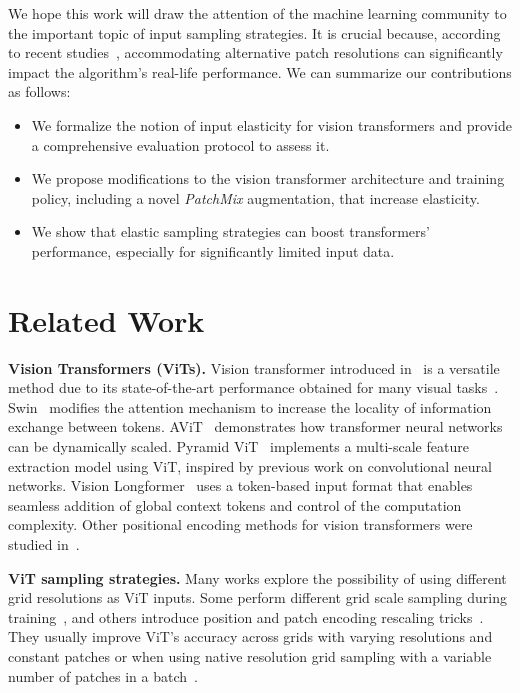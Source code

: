 \documentclass[10pt,twocolumn,letterpaper]{article}
\begin{document}
We hope this work will draw the attention of the machine learning community to the important topic of input sampling strategies. It is crucial because, according to recent studies~\cite{beyer2023flexivit}, accommodating alternative patch resolutions can significantly impact the algorithm's real-life performance. We can summarize our contributions as follows:
\begin{itemize}
    \item We formalize the notion of input elasticity for vision transformers and provide a comprehensive evaluation protocol to assess it.
    \item We propose modifications to the vision transformer architecture and training policy, including a novel \textit{PatchMix} augmentation, that increase elasticity.
    \item We show that elastic sampling strategies can boost transformers' performance, especially for significantly limited input data.
\end{itemize}

\section{Related Work} \label{sec:relwork}

\textbf{Vision Transformers (ViTs).}
Vision transformer introduced in~\cite{dosovitskiy2020vit} is a versatile method due to its state-of-the-art performance obtained for many visual tasks~\cite{touvron2022deit}. Swin~\cite{liu2021Swin} modifies the attention mechanism to increase the locality of information exchange between tokens. AViT~\cite{chen2021asvit} demonstrates how transformer neural networks can be dynamically scaled. Pyramid ViT~\cite{wang2021pyramid} implements a multi-scale feature extraction model using ViT, inspired by previous work on convolutional neural networks. Vision Longformer~\cite{zhang2021multi} uses a token-based input format that enables seamless addition of global context tokens and control of the computation complexity. Other positional encoding methods for vision transformers were studied in~\cite{chu2022conditional,ronen2023vision,ke2021musiq}.

\textbf{ViT sampling strategies.}
Many works explore the possibility of using different grid resolutions as ViT inputs. Some perform different grid scale sampling during training~\cite{li2021efficient,wu2020multigrid}, and others introduce position and patch encoding rescaling tricks~\cite{beyer2023flexivit}. They usually improve ViT's accuracy across grids with varying resolutions and constant patches or when using native resolution grid sampling with a variable number of patches in a batch~\cite{dehghani2024patch}.
\end{document}
